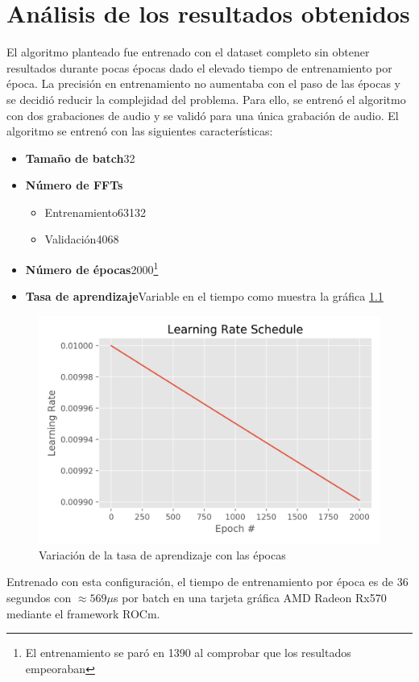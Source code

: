 \chapter{Análisis de los resultados obtenidos}\label{cp: results}
El algoritmo planteado fue entrenado con el dataset completo sin obtener resultados durante pocas épocas dado el elevado tiempo de entrenamiento por época. La precisión en entrenamiento no aumentaba con el paso de las épocas y se decidió reducir la complejidad del problema. Para ello, se entrenó el algoritmo con dos grabaciones de audio y se validó para una única grabación de audio. El algoritmo se entrenó con las siguientes características:
\begin{itemize}
	\item \textbf{Tamaño de batch}32
	\item \textbf{Número de \glspl{FFT}}
	\begin{itemize}
		\item Entrenamiento63132
		\item Validación4068
	\end{itemize}
	\item \textbf{Número de épocas}2000\footnote{El entrenamiento se paró en 1390 al comprobar que los resultados empeoraban}
	\item \textbf{Tasa de aprendizaje}Variable en el tiempo como muestra la gráfica \ref{fig: learning_rate}
\end{itemize}

\begin{figure}[h!]
	\centering
	\includegraphics[width=0.75\columnwidth]{figures/Learning_rate_schedule}
	\caption{Variación de la tasa de aprendizaje con las épocas}
	\label{fig: learning_rate}
\end{figure}

Entrenado con esta configuración, el tiempo de entrenamiento por época es de 36 segundos con $\approx 569\mu$s por batch en una tarjeta gráfica \gls{AMD} Radeon Rx570 mediante el \gls{framework} \gls{ROCm}. 


